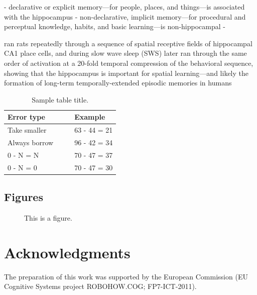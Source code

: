 \documentclass[10pt,letterpaper]{article}
\begin{document}
	- declarative or explicit memory—for people, places, and things—is associated with the hippocampus 
	- non-declarative, implicit memory—for procedural and perceptual knowledge, habits, and basic learning—is non-hippocampal
	- 

  ran rats repeatedly through a sequence of spatial receptive fields of hippocampal CA1 place cells, and during slow wave sleep (SWS) later ran through the same order of activation at a 20-fold temporal compression of the behavioral sequence, showing that the hippocampus is important for spatial learning—and likely the formation of long-term temporally-extended episodic memories in humans


\begin{table}[!ht]
\begin{center} 
\caption{Sample table title.} 
\label{sample-table} 
\vskip 0.12in
\begin{tabular}{ll} 
\hline
Error type    &  Example \\
\hline
Take smaller        &   63 - 44 = 21 \\
Always borrow~~~~   &   96 - 42 = 34 \\
0 - N = N           &   70 - 47 = 37 \\
0 - N = 0           &   70 - 47 = 30 \\
\hline
\end{tabular} 
\end{center} 
\end{table}


\subsection{Figures}


\begin{figure}[ht]
\begin{center}
\end{center}
\caption{This is a figure.} 
\label{sample-figure}
\end{figure}


\section{Acknowledgments}

The preparation of this work was supported by the European Commission (EU Cognitive Systems project ROBOHOW.COG; FP7-ICT-2011).






\setlength{\bibleftmargin}{.125in}
\setlength{\bibindent}{-\bibleftmargin}


\end{document}

